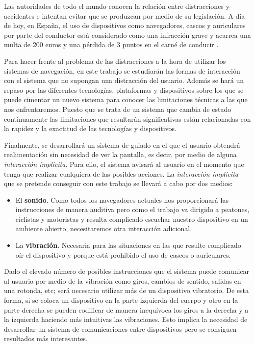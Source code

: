 Las autoridades de todo el mundo conocen la relación entre distracciones y accidentes e intentan
evitar que se produzcan por medio de su legislación. A día de hoy, en España, el uso de dispositivos
como navegadores, cascos y auriculares por parte del conductor está considerado como una infracción
grave y acarrea una multa de 200 euros y una pérdida de 3 puntos en el carné de conducir
\cite{Serrano14}.

Para hacer frente al problema de las distracciones a la hora de utilizar los sistemas de navegación,
en este trabajo se estudiarán las formas de interacción con el sistema que no supongan una
distracción del usuario. Además se hará un repaso por las diferentes tecnologías, plataformas y
dispositivos sobre los que se puede cimentar un nuevo sistema para conocer las limitaciones técnicas
a las que nos enfrentaremos. Puesto que se trata de un sistema que cambia de estado continuamente
las limitaciones que resultarán significativas están relacionadas con la rapidez y la exactitud de
las tecnologías y dispositivos.

Finalmente, se desarrollará un sistema de guiado en el que el usuario obtendrá realimentación sin
necesidad de ver la pantalla, es decir, por medio de alguna \emph{interacción implícita}. Para ello,
el sistema avisará al usuario en el momento que tenga que realizar cualquiera de las posibles
acciones. La \emph{interacción implícita} que se pretende conseguir con este trabajo se llevará a
cabo por dos medios:

\begin{itemize}
  \item El \textbf{sonido}. Como todos los navegadores actuales nos proporcionará las instrucciones
    de manera auditiva pero como el trabajo va dirigido a peatones, ciclistas y motoristas y resulta
    complicado escuchar nuestro dispositivo en un ambiente abierto, necesitaremos otra interacción
    adicional.
  \item La \textbf{vibración}. Necesaria para las situaciones en las que resulte complicado oír el
    dispositivo y porque está prohibido el uso de cascos o auriculares.
\end{itemize}

Dado el elevado número de posibles instrucciones que el sistema puede comunicar al usuario por medio
de la vibración como giros, cambios de sentido, salidas en una rotonda, etc; será necesario utilizar
más de un dispositivo vibratorio. De esta forma, si se coloca un dispositivo en la parte izquierda
del cuerpo y otro en la parte derecha se pueden codificar de manera inequívoca los giros a la
derecha y a la izquierda haciendo más intuitivas las vibraciones. Esto implica la necesidad de
desarrollar un sistema de comunicaciones entre dispositivos pero se consiguen resultados más
interesantes.

